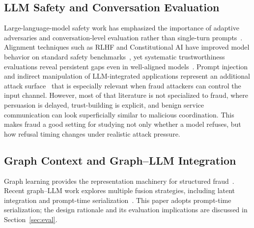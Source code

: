 \documentclass[10pt,letterpaper]{article}
\begin{document}
\subsection{LLM Safety and Conversation Evaluation}
Large-language-model safety work has emphasized the importance of adaptive adversaries and conversation-level evaluation rather than single-turn prompts~\cite{dong2024conversation,shi2024safety,yao2024security,wei2024jailbroken,zou2023universal}. Alignment techniques such as RLHF and Constitutional AI have improved model behavior on standard safety benchmarks~\cite{ouyang2022instructgpt,bai2022constitutional}, yet systematic trustworthiness evaluations reveal persistent gaps even in well-aligned models~\cite{sun2024trustllm,wang2023decodingtrust}. Prompt injection and indirect manipulation of LLM-integrated applications represent an additional attack surface~\cite{perez2022ignore,greshake2023indirect} that is especially relevant when fraud attackers can control the input channel. However, most of that literature is not specialized to fraud, where persuasion is delayed, trust-building is explicit, and benign service communication can look superficially similar to malicious coordination. This makes fraud a good setting for studying not only whether a model refuses, but how refusal timing changes under realistic attack pressure.

\subsection{Graph Context and Graph--LLM Integration}
Graph learning provides the representation machinery for structured fraud~\cite{kipf2016gcn,velickovic2018gat,hamilton2017graphsage,xia2021graph,wu2021gnn}. Recent graph--LLM work explores multiple fusion strategies, including latent integration and prompt-time serialization~\cite{pan2024llmgraphs,llmkg2024survey,multihopkg2024}. This paper adopts prompt-time serialization; the design rationale and its evaluation implications are discussed in Section~\ref{sec:eval}.
\end{document}
